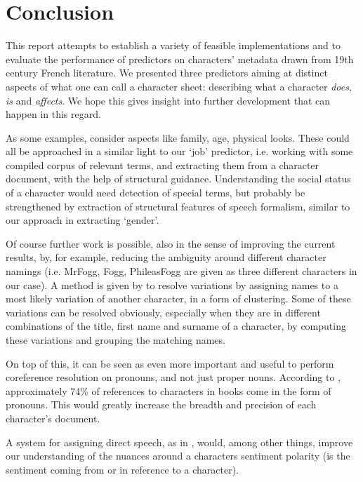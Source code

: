 \section{Conclusion}

This report attempts to establish a variety of feasible implementations and to evaluate the performance of predictors on characters' metadata drawn from 19th century French literature. We presented three predictors aiming at distinct aspects of what one can call a character sheet: describing what a character \textit{does}, \textit{is} and \textit{affects}. We hope this gives insight into further development that can happen in this regard.

As some examples, consider aspects like family, age, physical looks. These could all be approached in a similar light to our `job' predictor, i.e. working with some compiled corpus of relevant terms, and extracting them from a character document, with the help of structural guidance. Understanding the social status of a character would need detection of special terms, but probably be strengthened by extraction of structural features of speech formalism, similar to our approach in extracting `gender'.

Of course further work is possible, also in the sense of improving the current results, by, for example, reducing the ambiguity around different character namings (i.e. MrFogg, Fogg, PhileasFogg are given as three different characters in our case). A method is given by \cite{elson2010extracting} to resolve variations by assigning names to a most likely variation of another character, in a form of clustering. Some of these variations can be resolved obviously, especially when they are in different combinations of the title, first name and surname of a character, by computing these variations and grouping the matching names.

On top of this, it can be seen as even more important and useful to perform coreference resolution on pronouns, and not just proper nouns. According to \cite{bamman2014bayesian}, approximately 74\% of references to characters in books come in the form of pronouns. This would greatly increase the breadth and precision of each character's document.

A system for assigning direct speech, as in \cite{flekova2015personality}, would, among other things, improve our understanding of the nuances around a characters sentiment polarity (is the sentiment coming from or in reference to a character).

